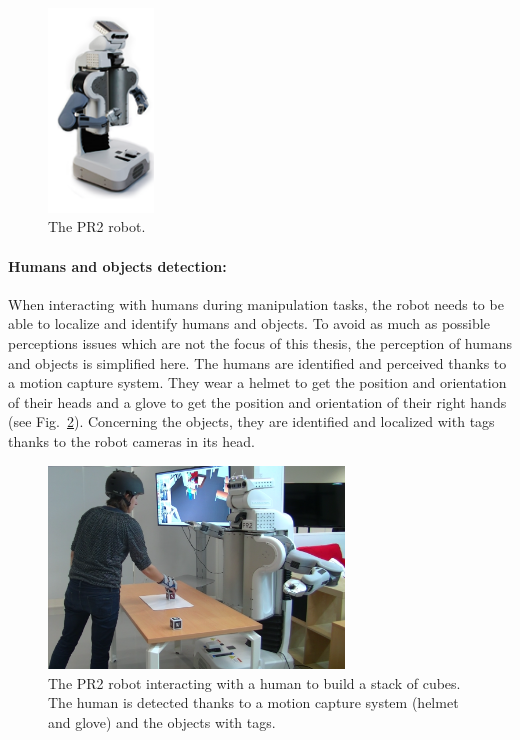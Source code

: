 \documentclass[english,a4paper,11pt,twoside]{StyleThese}
\begin{document}
\begin{figure}[!h]
	\centering
    \includegraphics[width=0.25\textwidth]{figs/Introduction/PR2.png}
    \caption{The PR2 robot.}
    \label{fig:PR2}
\end{figure}

\paragraph{Humans and objects detection:} When interacting with humans during manipulation tasks, the robot needs to be able to localize and identify humans and objects. To avoid as much as possible perceptions issues which are not the focus of this thesis, the perception of humans and objects is simplified here. The humans are identified and perceived thanks to a motion capture system. They wear a helmet to get the position and orientation of their heads and a glove to get the position and orientation of their right hands (see Fig.~\ref{fig:Environment}). Concerning the objects, they are identified and localized with tags thanks to the robot cameras in its head.

\begin{figure}[!h]
	\centering
    \includegraphics[width=0.7\textwidth]{figs/Introduction/SetUp.png}
    \caption{The PR2 robot interacting with a human to build a stack of cubes. The human is detected thanks to a motion capture system (helmet and glove) and the objects with tags.}
    \label{fig:Environment}
\end{figure}
\end{document}
